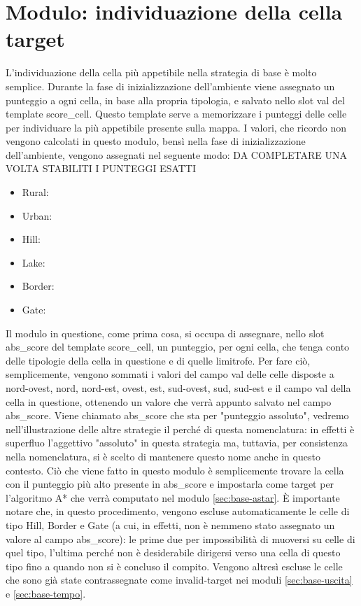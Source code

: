 \section{Modulo: individuazione della cella target} \label{sec:base-target}
L'individuazione della cella più appetibile nella strategia di base è molto semplice. Durante la fase di inizializzazione dell'ambiente viene assegnato un punteggio a ogni cella, in base alla propria tipologia, e salvato nello slot val del template score\_cell. Questo template serve a memorizzare i punteggi delle celle per individuare la più appetibile presente sulla mappa. I valori, che ricordo non vengono calcolati in questo modulo, bensì nella fase di inizializzazione dell'ambiente, vengono assegnati nel seguente modo: {\color{red}DA COMPLETARE UNA VOLTA STABILITI I PUNTEGGI ESATTI}
\begin{itemize}
	\item Rural: 
	\item Urban: 
	\item Hill: 
	\item Lake: 
	\item Border: 
	\item Gate: 	
\end{itemize}
Il modulo in questione, come prima cosa, si occupa di assegnare, nello slot abs\_score del template score\_cell, un punteggio, per ogni cella, che tenga conto delle tipologie della cella in questione e di quelle limitrofe. Per fare ciò, semplicemente, vengono sommati i valori del campo val delle celle disposte a nord-ovest, nord, nord-est, ovest, est, sud-ovest, sud, sud-est e il campo val della cella in questione, ottenendo un valore che verrà appunto salvato nel campo abs\_score. Viene chiamato abs\_score che sta per "punteggio assoluto", vedremo nell'illustrazione delle altre strategie il perché di questa nomenclatura: in effetti è superfluo l'aggettivo "assoluto" in questa strategia ma, tuttavia, per consistenza nella nomenclatura, si è scelto di mantenere questo nome anche in questo contesto.
Ciò che viene fatto in questo modulo è semplicemente trovare la cella con il punteggio più alto presente in abs\_score e impostarla come target per l'algoritmo A* che verrà computato nel modulo \ref{sec:base-astar}. È importante notare che, in questo procedimento, vengono escluse automaticamente le celle di tipo Hill, Border e Gate (a cui, in effetti, non è nemmeno stato assegnato un valore al campo abs\_score): le prime due per impossibilità di muoversi su celle di quel tipo, l'ultima perché non è desiderabile dirigersi verso una cella di questo tipo fino a quando non si è concluso il compito.
Vengono altresì escluse le celle che sono già state contrassegnate come invalid-target nei moduli \ref{sec:base-uscita} e \ref{sec:base-tempo}.

